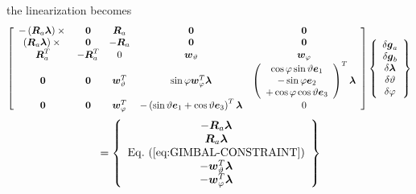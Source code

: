\documentclass[10pt,dvips]{report}
\newcommand{\T}[1]{\boldsymbol{#1}}
\begin{document}
the linearization becomes
\begin{equation*}
	\sqbr{\matr{ccccc}{
		-\plbr{\T{R}_a \T{\lambda}}\times{} & \T{0} & \T{R}_a & \T{0} & \T{0} \\
		\plbr{\T{R}_a \T{\lambda}}\times{} & \T{0} & -\T{R}_a & \T{0} & \T{0} \\
			\T{R}_a^T & -\T{R}_a^T & 0 & \T{w}_{\vartheta} & \T{w}_{\varphi} \\
		\T{0} & \T{0} & \T{w}_{\vartheta}^T &
			\sin\varphi\T{w}_{\varphi}^T \T{\lambda} &
			\plbr{\cvvect{
				\cos\varphi\sin\vartheta\T{e}_1 \\
				- \sin\varphi\T{e}_2 \\
				+ \cos\varphi\cos\vartheta\T{e}_3
			}}^T\T{\lambda} \\
		\T{0} & \T{0} & \T{w}_{\varphi}^T &
			-\plbr{\sin\vartheta\T{e}_1 + \cos\vartheta\T{e}_3}^T \T{\lambda} & 0
	}} \cubr{\cvvect{
		\delta\T{g}_a \\
		\delta\T{g}_b \\
		\delta\T{\lambda} \\
		\delta\vartheta \\
		\delta\varphi
	}}
\end{equation*}
\begin{equation*}
	\mbox{} = \cubr{\cvvect{
		-\T{R}_a \T{\lambda} \\
		\T{R}_a \T{\lambda} \\
		\mathrm{Eq.~(\ref{eq:GIMBAL-CONSTRAINT})} \\
		-\T{w}_{\vartheta}^T \T{\lambda} \\
		-\T{w}_{\varphi}^T \T{\lambda}
	}}
\end{equation*}
\end{document}
